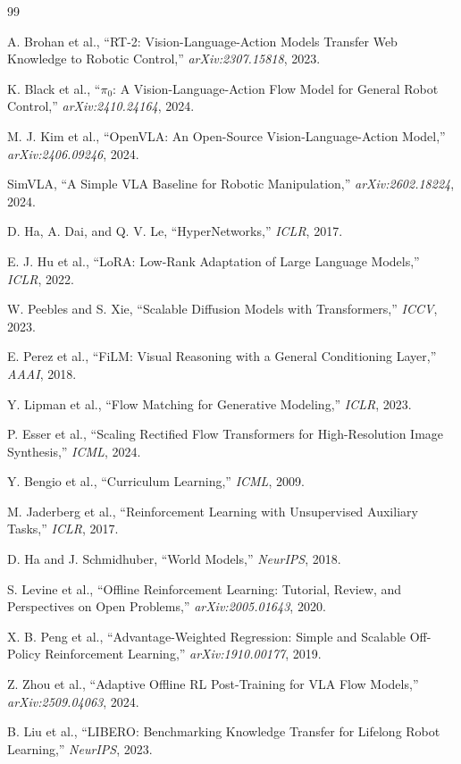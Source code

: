 \documentclass[10pt,twocolumn]{ctexart}
\begin{document}

\begin{thebibliography}{99}

A. Brohan et al., ``RT-2: Vision-Language-Action Models Transfer Web Knowledge to Robotic Control,''
\textit{arXiv:2307.15818}, 2023.

K. Black et al., ``$\pi_0$: A Vision-Language-Action Flow Model for General Robot Control,''
\textit{arXiv:2410.24164}, 2024.

M. J. Kim et al., ``OpenVLA: An Open-Source Vision-Language-Action Model,''
\textit{arXiv:2406.09246}, 2024.

SimVLA, ``A Simple VLA Baseline for Robotic Manipulation,''
\textit{arXiv:2602.18224}, 2024.

D. Ha, A. Dai, and Q. V. Le, ``HyperNetworks,''
\textit{ICLR}, 2017.

E. J. Hu et al., ``LoRA: Low-Rank Adaptation of Large Language Models,''
\textit{ICLR}, 2022.

W. Peebles and S. Xie, ``Scalable Diffusion Models with Transformers,''
\textit{ICCV}, 2023.

E. Perez et al., ``FiLM: Visual Reasoning with a General Conditioning Layer,''
\textit{AAAI}, 2018.

Y. Lipman et al., ``Flow Matching for Generative Modeling,''
\textit{ICLR}, 2023.

P. Esser et al., ``Scaling Rectified Flow Transformers for High-Resolution Image Synthesis,''
\textit{ICML}, 2024.

Y. Bengio et al., ``Curriculum Learning,''
\textit{ICML}, 2009.

M. Jaderberg et al., ``Reinforcement Learning with Unsupervised Auxiliary Tasks,''
\textit{ICLR}, 2017.

D. Ha and J. Schmidhuber, ``World Models,''
\textit{NeurIPS}, 2018.

S. Levine et al., ``Offline Reinforcement Learning: Tutorial, Review, and Perspectives on Open Problems,''
\textit{arXiv:2005.01643}, 2020.

X. B. Peng et al., ``Advantage-Weighted Regression: Simple and Scalable Off-Policy Reinforcement Learning,''
\textit{arXiv:1910.00177}, 2019.

Z. Zhou et al., ``Adaptive Offline RL Post-Training for VLA Flow Models,''
\textit{arXiv:2509.04063}, 2024.

B. Liu et al., ``LIBERO: Benchmarking Knowledge Transfer for Lifelong Robot Learning,''
\textit{NeurIPS}, 2023.

\end{thebibliography}
\end{document}
